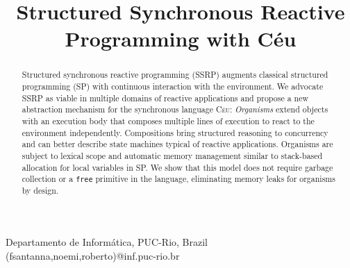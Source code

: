 \documentclass{sigplanconf}
\newcommand{\CEU}{\textsc{C\'{e}u}\xspace}
\newcommand{\code}[1] {{\small{\texttt{#1}}}}
\newcommand{\1}{\;}
\newcommand{\2}{\;\;}
\newcommand{\3}{\;\;\;}
\newcommand{\5}{\;\;\;\;\;}
\begin{document}
\sloppy



\title {
    Structured Synchronous Reactive Programming with C\'eu
}

           {Departamento de Inform\'atica, PUC-Rio, Brazil}
           {(fsantanna,noemi,roberto)@inf.puc-rio.br}


\maketitle

\begin{abstract}
Structured synchronous reactive programming (SSRP) augments classical 
structured programming (SP) with continuous interaction with the environment.
%
We advocate SSRP as viable in multiple domains of reactive applications and 
propose a new abstraction mechanism for the synchronous language \CEU:
%
\emph{Organisms} extend objects with an execution body that composes multiple 
lines of execution to react to the environment independently.
%
Compositions bring structured reasoning to concurrency and can better describe 
state machines typical of reactive applications.
%
Organisms are subject to lexical scope and automatic memory management similar 
to stack-based allocation for local variables in SP.
We show that this model does not require garbage collection or a \code{free} 
primitive in the language, eliminating memory leaks for organisms by design.
\end{abstract}

\end{document}
